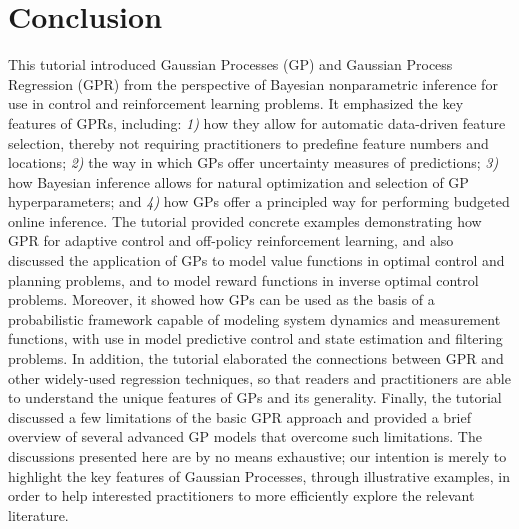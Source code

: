 \section{Conclusion}\label{sec:conclusion}
This tutorial introduced Gaussian Processes (GP) and Gaussian Process Regression (GPR) from the perspective of Bayesian nonparametric inference for use in control and reinforcement learning problems. It emphasized the key features of GPRs, including: \emph{1)} how they allow for automatic data-driven feature selection, thereby not requiring practitioners to predefine feature numbers and locations; \emph{2)} the way in which GPs offer uncertainty measures of predictions; \emph{3)} how Bayesian inference allows for natural optimization and selection of GP hyperparameters; and \emph{4)} how GPs offer a principled way for performing budgeted online inference. The tutorial provided concrete examples demonstrating how GPR for adaptive control and off-policy reinforcement learning, and also discussed the application of GPs to model value functions in optimal control and planning problems, and to model reward functions in inverse optimal control problems. Moreover, it showed how GPs can be used as the basis of a probabilistic framework capable of modeling system dynamics and measurement functions, with use in model predictive control and state estimation and filtering problems. In addition, the tutorial elaborated the connections between GPR and other widely-used regression techniques, so that  readers and practitioners are able to understand the unique features of GPs and its generality. Finally, the tutorial discussed a few limitations of the basic GPR approach and provided a brief overview of several advanced GP models that overcome such limitations. The discussions presented here are by no means exhaustive; our intention is merely to highlight the key features of Gaussian Processes, through illustrative examples, in order to help interested practitioners to more efficiently explore the relevant literature.

